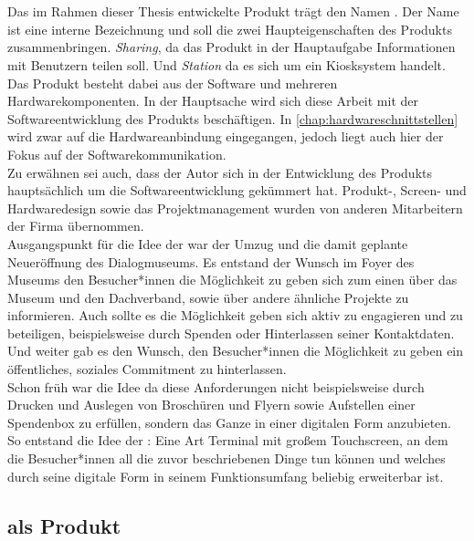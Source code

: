 \section{\shst{}}
\label{sec:sharing-station}

Das im Rahmen dieser Thesis entwickelte Produkt trägt den Namen \shst{}. Der Name 
ist eine interne Bezeichnung und soll die zwei Haupteigenschaften des Produkts zusammenbringen.
\emph{Sharing}, da das Produkt in der Hauptaufgabe Informationen mit Benutzern teilen soll. 
Und \emph{Station} da es sich um ein Kiosksystem handelt.\\

Das Produkt besteht dabei aus der Software und mehreren Hardwarekomponenten. In der Hauptsache
wird sich diese Arbeit mit der Softwareentwicklung des Produkts beschäftigen. In \autoref{chap:hardwareschnittstellen} 
wird zwar auf die Hardwareanbindung eingegangen, jedoch liegt auch hier der Fokus auf der Softwarekommunikation.\\
Zu erwähnen sei auch, dass der Autor sich in der Entwicklung des Produkts hauptsächlich um die Softwareentwicklung 
gekümmert hat. Produkt-, Screen- und Hardwaredesign sowie das Projektmanagement wurden von anderen Mitarbeitern
der Firma \meso{} übernommen.\\

Ausgangspunkt für die Idee der \shst{} war der Umzug und die damit geplante Neueröffnung des Dialogmuseums.
Es entstand der Wunsch im Foyer des Museums den Besucher*innen die Möglichkeit zu geben sich zum einen 
über das Museum und den Dachverband, sowie über andere ähnliche Projekte zu informieren. Auch sollte
es die Möglichkeit geben sich aktiv zu engagieren und zu beteiligen, beispielsweise durch Spenden oder 
Hinterlassen seiner Kontaktdaten. Und weiter gab es den Wunsch, den Besucher*innen die Möglichkeit zu geben ein 
öffentliches, soziales Commitment zu hinterlassen.\\
Schon früh war die Idee da diese Anforderungen nicht beispielsweise durch Drucken und Auslegen von 
Broschüren und Flyern sowie Aufstellen einer Spendenbox zu erfüllen, sondern das Ganze in einer digitalen
Form anzubieten. So entstand die Idee der \shst{}: Eine Art Terminal mit großem Touchscreen, an dem die Besucher*innen 
all die zuvor beschriebenen Dinge tun können und welches durch seine digitale Form in seinem Funktionsumfang
beliebig erweiterbar ist.

\subsection{\shst{} als Produkt}
\label{subs:sharing-station-produkt}

